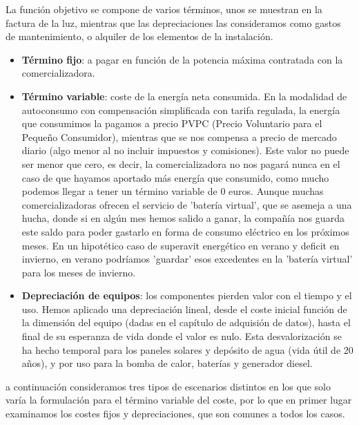 La función objetivo se compone de varios términos, unos se muestran en la
factura de la luz, mientras que las depreciaciones las consideramos como gastos
de mantenimiento, o alquiler de los elementos de la instalación.

\begin{itemize}
	\item \textbf{Término fijo}: a pagar en función de la potencia máxima
	      contratada con la comercializadora.

	\item \textbf{Término variable}: coste de la energía neta consumida. En la
	      modalidad de autoconsumo con compensación simplificada con tarifa regulada,
	      la energía que consumimos la pagamos a precio PVPC (Precio Voluntario para el
	      Pequeño Consumidor), mientras que se nos compensa a precio de mercado diario
	      (algo menor al no incluir impuestos y comisiones). Este valor no puede ser
	      menor que cero, es decir, la comercializadora no nos pagará nunca en el caso
	      de que hayamos aportado más energía que consumido, como mucho podemos llegar
	      a tener un término variable de 0 euros. Aunque muchas comercializadoras
	      ofrecen el servicio de 'batería virtual', que se asemeja a una hucha, donde
	      si en algún mes hemos salido a ganar, la compañía nos guarda este saldo para
	      poder gastarlo en forma de consumo eléctrico en los próximos meses. En un
	      hipotético caso de superavit energético en verano y deficit en invierno, en
	      verano podríamos 'guardar' esos excedentes en la 'batería virtual' para los
	      meses de invierno.

	\item \textbf{Depreciación de equipos}: los componentes pierden valor con el
	      tiempo y el uso. Hemos aplicado una depreciación lineal, desde el coste
	      inicial función de la dimensión del equipo (dadas en el capítulo de adquisión
	      de datos), hasta el final de su esperanza de vida donde el valor es nulo.
	      Esta desvalorización se ha hecho temporal para los paneles solares y depósito
	      de agua (vida útil de 20 años), y por uso para la bomba de calor, baterías y
	      generador diesel.
\end{itemize}

a continuación consideramos tres tipos de escenarios distintos en los que solo
varía la formulación para el término variable del coste, por lo que en primer
lugar examinamos los costes fijos y depreciaciones, que son comunes a todos los
casos.

